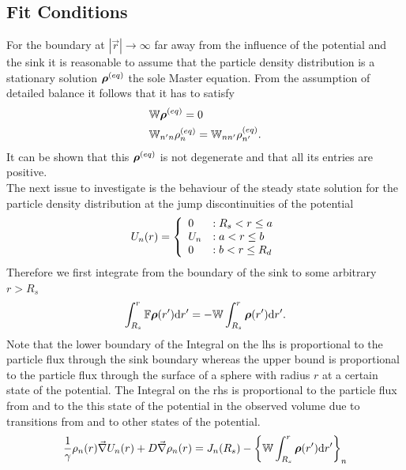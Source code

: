 \subsection{Fit Conditions}
For the boundary at $|\vec{r}| \rightarrow \infty$ far away from the influence of the potential and the sink it is reasonable to assume that the particle density distribution is a stationary solution $\boldsymbol{\mathbf{\rho}}^{(eq)}$ the sole Master equation. From the assumption of detailed balance it follows that it has to satisfy
\begin{align}
    &\mathbb{W} \boldsymbol{\mathbf{\rho}}^{(eq)} = 0 \nonumber \\
    &\mathbb{W}_{n'n} \rho_n^{(eq)} = \mathbb{W}_{nn'}\rho_{n'}^{(eq)}.
    \label{detailed_balance2}
\end{align}
It can be shown that this $\boldsymbol{\mathbf{\rho}}^{(eq)}$ is not degenerate and that all its entries are positive. \\
The next issue to investigate is the behaviour of the steady state solution for the particle density distribution at the jump discontinuities of the potential 
\begin{equation}
  U_n(r) = \left\{ \begin{array}{l l} 
        0 &: R_s < r \le a \\
        U_n &: a<r \le b \\
        0 &: b < r \le R_d
    \end{array} \right.
    \label{step_potential}
\end{equation}
Therefore we first integrate from the boundary of the sink to some arbitrary $r > R_s$
\begin{equation*}
    \int_{R_s}^{r}\mathbb{F}\boldsymbol{\mathbf{\rho}}(r'){\rm d} r' = - \mathbb{W} \int_{R_s}^{r} \boldsymbol{\mathbf{\rho}}(r') {\rm d} r' .
\end{equation*}
Note that the lower boundary of the Integral on the lhs is proportional to the particle flux through the sink boundary whereas the upper bound is proportional to the particle flux through the surface of a sphere with radius $r$ at a certain state of the potential. The Integral on the rhs is proportional to the particle flux from and to the this state of the potential in the observed volume due to transitions from and to other states of the potential.\\
    \begin{equation}
        \frac{1}{\gamma}\rho_n(r) \vec{\nabla} U_n(r) + D \vec{\nabla} \rho_n(r) = J_n(R_s) - \left\{ \mathbb{W} \int_{R_s}^{r} \boldsymbol{\mathbf{\rho}}(r') {\rm d} r' \right\}_{n}
    \end{equation}
